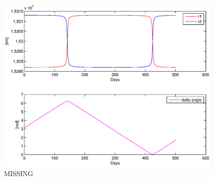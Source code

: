 \begin{figure}[th!]
\centering
\includegraphics[width=1\textwidth]{./graphics/subplot.eps}
\caption[tekst i indholdsfortegnelsen]{MISSING}
\label{fig:}
\end{figure}


